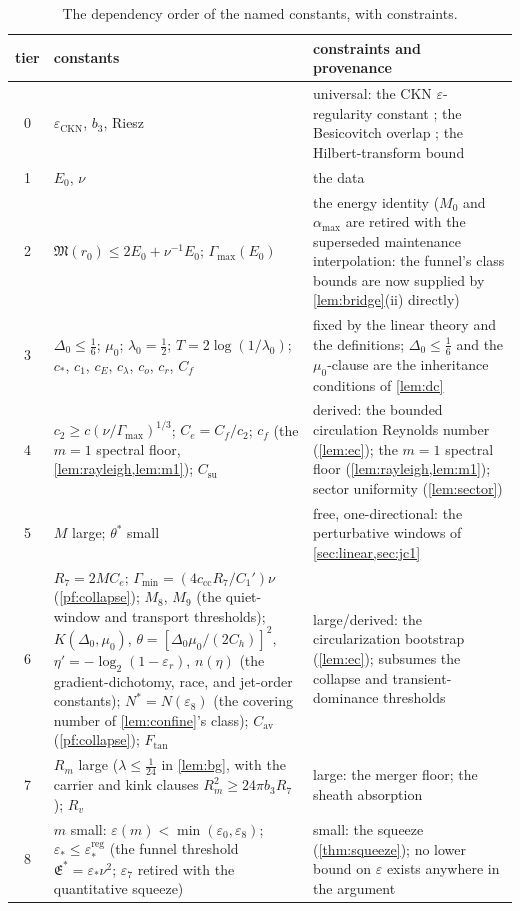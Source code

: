 \documentclass[11pt,letterpaper]{amsart}
\theoremstyle{definition}
\theoremstyle{remark}
\begin{document}
\begin{table}[H]
\centering\small
\begin{tabular}{@{}cp{}p{}@{}}
\toprule
tier & constants & constraints and provenance \\
\midrule
0 & $\varepsilon_{\mathrm{CKN}}$, $b_3$, Riesz & universal: the CKN
$\varepsilon$-regularity constant \cite{CKN1982,Lin1998}; the Besicovitch overlap
\cite{Mattila1995}; the Hilbert-transform bound \\
1 & $E_0$, $\nu$ & the data \\
2 & $\mathfrak{M}(r_0)\le2E_0+\nu^{-1}E_0$;\; $\Gamma_{\max}(E_0)$ & the energy
identity ($M_0$ and $\alpha_{\max}$ are retired with the superseded
maintenance interpolation: the funnel's class bounds are now supplied by
\cref{lem:bridge}\textup{(ii)} directly) \\
3 & $\Delta_0\le\tfrac16$; $\mu_0$; $\lambda_0=\tfrac12$; $T=2\log(1/\lambda_0)$; $c_*$,
$c_1$, $c_E$, $c_\lambda$, $c_o$, $c_r$, $C_f$ & fixed by the linear theory and the
definitions; $\Delta_0\le\tfrac16$ and the $\mu_0$-clause are the inheritance conditions of \cref{lem:dc} \\
4 & $c_2\ge c(\nu/\Gamma_{\max})^{1/3}$; $C_e=C_f/c_2$; $c_f$ (the $m=1$
spectral floor, \cref{lem:rayleigh,lem:m1});
$C_{\mathrm{su}}$ & derived: the bounded circulation Reynolds number
(\cref{lem:ec}); the $m=1$ spectral floor (\cref{lem:rayleigh,lem:m1});
sector uniformity (\cref{lem:sector}) \\
5 & $M$ large; $\theta^*$ small & free, one-directional: the perturbative windows of
\cref{sec:linear,sec:jc1} \\
6 & $R_7=2MC_e$; $\Gamma_{\min}=(4c_{\mathrm{cc}}R_7/C_1')\nu$
(\cref{pf:collapse}); $M_8$, $M_9$ (the quiet-window and transport
thresholds); $K(\Delta_0,\mu_0)$, $\theta=[\Delta_0\mu_0/(2C_h)]^2$,
$\eta'=-\log_2(1-\varepsilon_r)$, $n(\eta)$ (the gradient-dichotomy, race,
and jet-order constants); $N^*=N(\varepsilon_8)$ (the covering number of
\cref{lem:confine}'s class); $C_{\mathrm{av}}$ (\cref{pf:collapse});
$F_{\mathrm{tan}}$ & large/derived: the circularization bootstrap
(\cref{lem:ec}); subsumes the collapse and transient-dominance thresholds \\
7 & $R_m$ large ($\lambda\le\tfrac1{24}$ in \cref{lem:bg}, with the carrier and
kink clauses $R_m^2\ge24\pi b_3R_7$); $R_v$ & large: the
merger floor; the sheath absorption \\
8 & $m$ small: $\varepsilon(m)<\min(\varepsilon_0,\varepsilon_8)$;\;
$\varepsilon_*\le\varepsilon_*^{\mathrm{reg}}$ (the funnel threshold
$\mathfrak{E}^*=\varepsilon_*\nu^2$; $\varepsilon_7$ retired with the
quantitative squeeze) & small: the
squeeze (\cref{thm:squeeze}); no lower bound on $\varepsilon$ exists anywhere in the
argument \\
\bottomrule
\end{tabular}
\caption{The dependency order of the named constants, with constraints.}
\label{tab:constantsfull}
\end{table}
\end{document}
